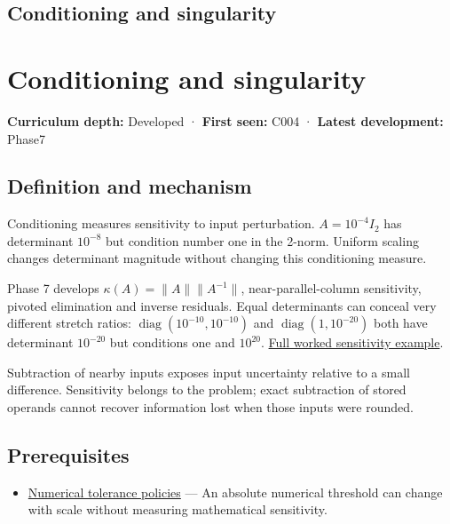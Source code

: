 \hypertarget{appendix-8f6a01f284a7}{}
\section*{Conditioning and singularity}
\chapter{Conditioning and singularity}\label{appendix-8f6a01f284a7-conditioning-and-singularity}

\textbf{Curriculum depth:} Developed · \textbf{First seen:} C004 · \textbf{Latest development:} Phase7

\section{Definition and mechanism}\label{appendix-8f6a01f284a7-definition-and-mechanism}

Conditioning measures sensitivity to input perturbation. \(A=10^{-4}I_2\) has determinant \(10^{-8}\) but condition number one in the 2-norm. Uniform scaling changes determinant magnitude without changing this conditioning measure.

Phase 7 develops \(\kappa(A)=\|A\|\|A^{-1}\|\), near-parallel-column sensitivity, pivoted elimination and inverse residuals. Equal determinants can conceal very different stretch ratios: \(\operatorname{diag}(10^{-10},10^{-10})\) and \(\operatorname{diag}(1,10^{-20})\) both have determinant \(10^{-20}\) but conditions one and \(10^{20}\). \href{Continuous\%20Notes/Computing\%20Foundations\%20-\%20From\%20Bits\%20to\%20C++\%20and\%20Systems\%20APIs\#An\%20inverse\%20can\%20exist\%20and\%20still\%20amplify\%20uncertainty}{Full worked sensitivity example}.

Subtraction of nearby inputs exposes input uncertainty relative to a small difference. Sensitivity belongs to the problem; exact subtraction of stored operands cannot recover information lost when those inputs were rounded.

\section{Prerequisites}\label{appendix-8f6a01f284a7-prerequisites}

\begin{itemize}
\tightlist
\item
  \hyperref[appendix-0ec599f8ba27]{Numerical tolerance policies} --- An absolute numerical threshold can change with scale without measuring mathematical sensitivity.
\end{itemize}

